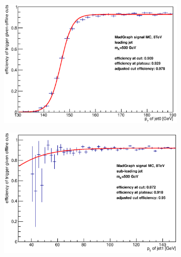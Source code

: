 \begin{figure}[phtb!]
\begin{center}
  \begin{subfigure}[leading jet, $m_{A}=500$ GeV]{0.4\textwidth}\includegraphics[width=\textwidth]{Systematics/images/jet0_trigger_turn_on_bAbb_500_j35.eps}\end{subfigure}
  \begin{subfigure}[sub-leading jet, $m_{A}=500$ GeV]{0.4\textwidth}\includegraphics[width=\textwidth]{Systematics/images/jet1_trigger_turn_on_bAbb_500_j35.eps}\end{subfigure}

\end{center}
\end{figure}
